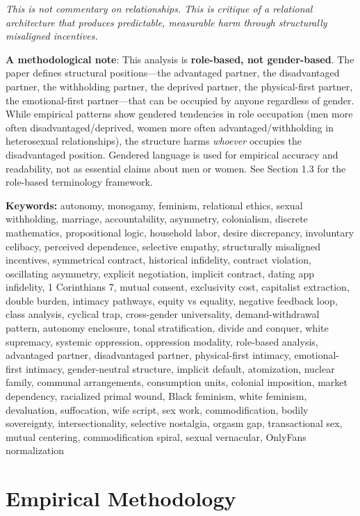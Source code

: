 \documentclass[12pt,openany]{book}
\numberwithin{equation}{chapter}
\begin{document}
\textit{This is not commentary on relationships. This is critique of a relational architecture that produces predictable, measurable harm through structurally misaligned incentives.}

\textbf{A methodological note}: This analysis is \textbf{role-based, not gender-based}. The paper defines structural positions---the advantaged partner, the disadvantaged partner, the withholding partner, the deprived partner, the physical-first partner, the emotional-first partner---that can be occupied by anyone regardless of gender. While empirical patterns show gendered tendencies in role occupation (men more often disadvantaged/deprived, women more often advantaged/withholding in heterosexual relationships), the structure harms \textit{whoever} occupies the disadvantaged position. Gendered language is used for empirical accuracy and readability, not as essential claims about men or women. See Section 1.3 for the role-based terminology framework.

\textbf{Keywords:} autonomy, monogamy, feminism, relational ethics, sexual withholding, marriage, accountability, asymmetry, colonialism, discrete mathematics, propositional logic, household labor, desire discrepancy, involuntary celibacy, perceived dependence, selective empathy, structurally misaligned incentives, symmetrical contract, historical infidelity, contract violation, oscillating asymmetry, explicit negotiation, implicit contract, dating app infidelity, 1 Corinthians 7, mutual consent, exclusivity cost, capitalist extraction, double burden, intimacy pathways, equity vs equality, negative feedback loop, class analysis, cyclical trap, cross-gender universality, demand-withdrawal pattern, autonomy enclosure, tonal stratification, divide and conquer, white supremacy, systemic oppression, oppression modality, role-based analysis, advantaged partner, disadvantaged partner, physical-first intimacy, emotional-first intimacy, gender-neutral structure, implicit default, atomization, nuclear family, communal arrangements, consumption units, colonial imposition, market dependency, racialized primal wound, Black feminism, white feminism, devaluation, suffocation, wife script, sex work, commodification, bodily sovereignty, intersectionality, selective nostalgia, orgasm gap, transactional sex, mutual centering, commodification spiral, sexual vernacular, OnlyFans normalization

\newpage

\chapter*{Empirical Methodology}
\end{document}
